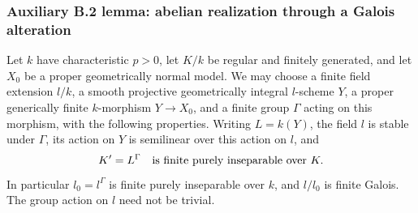 \subsubsection*{Auxiliary B.2 lemma: abelian realization through a Galois alteration}

\begin{lemma}
\label{B:equivariant-constant-data}
Let $k$ have characteristic $p>0$, let $K/k$ be regular and
finitely generated, and let $X_0$ be a proper geometrically
normal model.  We may choose a finite field extension $l/k$,
a smooth projective geometrically integral $l$-scheme $Y$, a
proper generically finite $k$-morphism $Y\to X_0$, and a finite
group $\Gamma$ acting on this morphism, with the following
properties.  Writing $L=k(Y)$, the field $l$ is stable under
$\Gamma$, its action on $Y$ is semilinear over this action on
$l$, and
\[
 K'=L^\Gamma\quad\hbox{is finite purely inseparable over }K.
\]
In particular $l_0=l^\Gamma$ is finite purely inseparable over
$k$, and $l/l_0$ is finite Galois.  The group action on $l$
need not be trivial.
\end{lemma}
